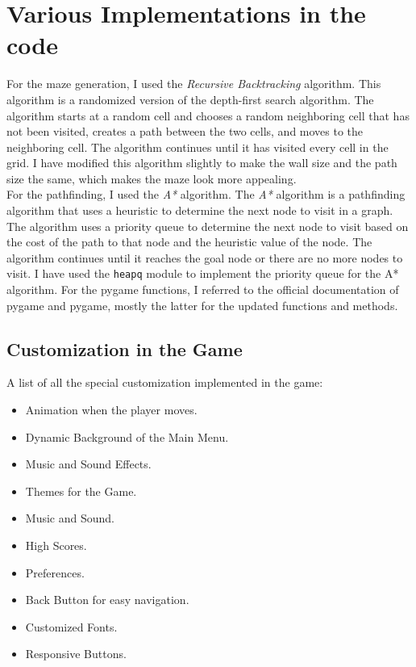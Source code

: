 \documentclass[10pt]{article}
\begin{document}
    \section{Various Implementations in the code}\label{sec:my-project-journey-and-various-implementations-in-the-code}
    For the maze generation, I used the \emph{Recursive Backtracking} algorithm.
    This algorithm is a randomized version of the depth-first search algorithm.
    The algorithm starts at a random cell and chooses a random neighboring cell that has not been visited, creates a path between the two cells, and moves to the neighboring cell.
    The algorithm continues until it has visited every cell in the grid.
    I have modified this algorithm slightly to make the wall size and the path size the same, which makes the maze look more appealing.
    \cite{MazeGeneration}\\
    For the pathfinding, I used the \emph{A*} algorithm.
    The \emph{A*} algorithm is a pathfinding algorithm that uses a heuristic to determine the next node to visit in a graph.
    The algorithm uses a priority queue to determine the next node to visit based on the cost of the path to that node and the heuristic value of the node.
    The algorithm continues until it reaches the goal node or there are no more nodes to visit.
    I have used the \texttt{heapq} module to implement the priority queue for the A* algorithm.
    \cite{MazeSolver}
    For the pygame functions, I referred to the official documentation of pygame\cite{pygameDoc} and pygame\cite{pygameCEDoc}, mostly the latter for the updated functions and methods.\\

    \subsection{Customization in the Game}\label{subsec:customisations-in-the-game}
    A list of all the special customization implemented in the game:
    \begin{itemize}
        \item Animation when the player moves.
        \item Dynamic Background of the Main Menu.
        \item Music and Sound Effects.
        \item Themes for the Game.
        \item Music and Sound.
        \item High Scores.
        \item Preferences.
        \item Back Button for easy navigation.
        \item Customized Fonts.
        \item Responsive Buttons.
    \end{itemize}
\end{document}
